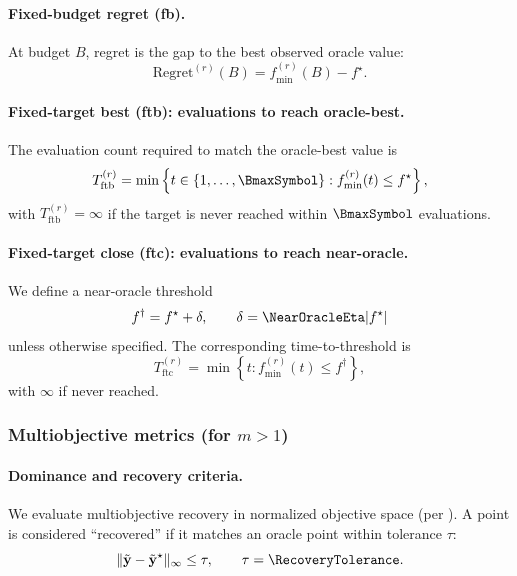 \paragraph{Fixed-budget regret (fb).}
At budget \(B\), regret is the gap to the best observed oracle value:
\begin{equation}
    \mathrm{Regret}^{(r)}(B) = f_{\min}^{(r)}(B) - f^\star.
\end{equation}

\paragraph{Fixed-target best (ftb): evaluations to reach oracle-best.}
The evaluation count required to match the oracle-best value is
\begin{equation}
    T_{\mathrm{ftb}}^{(r)} =
    \min\left\{t \in \{1,\dots,\BmaxSymbol\} : f_{\min}^{(r)}(t) \le f^\star \right\},
\end{equation}
with \(T_{\mathrm{ftb}}^{(r)}=\infty\) if the target is never reached within \(\BmaxSymbol\) evaluations.

\paragraph{Fixed-target close (ftc): evaluations to reach near-oracle.}
We define a near-oracle threshold
\[
    f^{\dagger} = f^\star + \delta,
    \qquad
    \delta = \NearOracleEta |f^\star|
\]
unless otherwise specified.
The corresponding time-to-threshold is
\begin{equation}
    T_{\mathrm{ftc}}^{(r)} =
    \min\left\{t : f_{\min}^{(r)}(t) \le f^{\dagger} \right\},
\end{equation}
with \(\infty\) if never reached.

\subsubsection{Multiobjective metrics (for \(m>1\))}

\paragraph{Dominance and recovery criteria.}
We evaluate multiobjective recovery in normalized objective space (per \ObjectiveNormalizationPolicy{}).
A point is considered ``recovered'' if it matches an oracle point within tolerance \(\tau\):
\[
    \|\tilde{\mathbf{y}} - \tilde{\mathbf{y}}^\star\|_{\infty} \le \tau,
    \qquad
    \tau=\RecoveryTolerance.
\]

